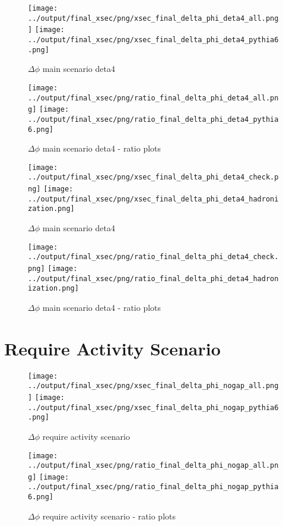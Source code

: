 \documentclass[11pt]{article}
\begin{document}
\begin{figure}[ht]
\centering
\texttt{[image: ../output/final\_xsec/png/xsec\_final\_delta\_phi\_deta4\_all.png]}
\texttt{[image: ../output/final\_xsec/png/xsec\_final\_delta\_phi\_deta4\_pythia6.png]}
\caption{$\Delta\phi$ main scenario deta4}
\label{fig:delta_phi_deta4}
\end{figure}

\begin{figure}[ht]
\centering
\texttt{[image: ../output/final\_xsec/png/ratio\_final\_delta\_phi\_deta4\_all.png]}
\texttt{[image: ../output/final\_xsec/png/ratio\_final\_delta\_phi\_deta4\_pythia6.png]}
\caption{$\Delta\phi$ main scenario deta4 - ratio plots}
\label{fig:delta_phi_deta4_ratio}
\end{figure}

\begin{figure}[ht]
\centering
\texttt{[image: ../output/final\_xsec/png/xsec\_final\_delta\_phi\_deta4\_check.png]}
\texttt{[image: ../output/final\_xsec/png/xsec\_final\_delta\_phi\_deta4\_hadronization.png]}
\caption{$\Delta\phi$ main scenario deta4}
\label{fig:delta_phi_deta4b}
\end{figure}

\begin{figure}[ht]
\centering
\texttt{[image: ../output/final\_xsec/png/ratio\_final\_delta\_phi\_deta4\_check.png]}
\texttt{[image: ../output/final\_xsec/png/ratio\_final\_delta\_phi\_deta4\_hadronization.png]}
\caption{$\Delta\phi$ main scenario deta4 - ratio plots}
\label{fig:delta_phi_deta4b_ratio}
\end{figure}

\clearpage
\section{Require Activity Scenario}

\begin{figure}[ht]
\centering
\texttt{[image: ../output/final\_xsec/png/xsec\_final\_delta\_phi\_nogap\_all.png]}
\texttt{[image: ../output/final\_xsec/png/xsec\_final\_delta\_phi\_nogap\_pythia6.png]}
\caption{$\Delta\phi$ require activity scenario}
\label{fig:delta_phi_nogap}
\end{figure}

\begin{figure}[ht]
\centering
\texttt{[image: ../output/final\_xsec/png/ratio\_final\_delta\_phi\_nogap\_all.png]}
\texttt{[image: ../output/final\_xsec/png/ratio\_final\_delta\_phi\_nogap\_pythia6.png]}
\caption{$\Delta\phi$ require activity scenario - ratio plots}
\label{fig:delta_phi_nogap_ratio}
\end{figure}
\end{document}
